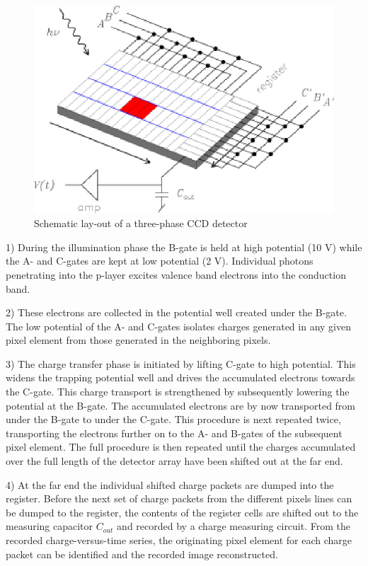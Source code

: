 \begin{figure}[h]
  \centering
	\includegraphics{CCD_schematic.eps}
  \caption{Schematic lay-out of a three-phase CCD detector}
  \label{CCD.figschematic}
\end{figure}

1) During the illumination phase the B-gate is held at high potential
(10 V) while the A- and C-gates are kept at low potential (2
V). Individual photons penetrating into the p-layer excites valence
band electrons into the conduction band. 

2) These electrons are collected in the potential well created under
the B-gate. The low potential of the A- and C-gates isolates charges
generated in any given pixel element from those generated in the
neighboring pixels.

3) The charge transfer phase is initiated by lifting C-gate to high
potential. This widens the trapping potential well and drives the
accumulated electrons towards the C-gate. This charge transport is
strengthened by subsequently lowering the potential at the B-gate. The
accumulated electrons are by now transported from under the B-gate to
under the C-gate. This procedure is next repeated twice, transporting
the electrons further on to the A- and B-gates of the subsequent pixel
element. The full procedure is then repeated until the charges
accumulated over the full length of the detector array have been
shifted out at the far end.

4) At the far end the individual shifted charge packets are dumped into
the register. Before the next set of charge packets from the different
pixels lines can be dumped to the register, the contents of the
register cells are shifted out to the measuring capacitor $C_{out}$ and
recorded by a charge measuring circuit. From the recorded
charge-versus-time series, the originating pixel element for each
charge packet can be identified and the recorded image reconstructed.

